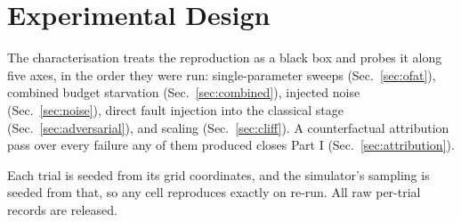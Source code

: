 \section{Experimental Design}
\label{sec:chardesign}

The characterisation treats the reproduction as a black box and probes it
along five axes, in the order they were run: single-parameter sweeps
(Sec.~\ref{sec:ofat}), combined budget starvation
(Sec.~\ref{sec:combined}), injected noise (Sec.~\ref{sec:noise}), direct
fault injection into the classical stage (Sec.~\ref{sec:adversarial}), and
scaling (Sec.~\ref{sec:cliff}). A counterfactual attribution pass over every
failure any of them produced closes Part I (Sec.~\ref{sec:attribution}).

Each trial is seeded from its grid coordinates, and the simulator's sampling
is seeded from that, so any cell reproduces exactly on re-run. All raw
per-trial records are released.
